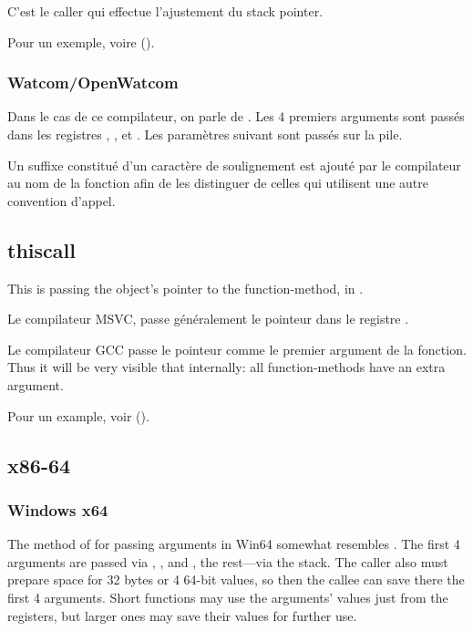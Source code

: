 C'est le \gls{caller} qui effectue l'ajustement du \gls{stack pointer}.

Pour un exemple, voire ().

\subsubsection{Watcom/OpenWatcom}

Dans le cas de ce compilateur, on parle de .
Les 4 premiers arguments sont passés dans les registres \EAX, \EDX, \EBX et \ECX.
Les paramètres suivant sont passés sur la pile.

Un suffixe constitué d'un caractère de soulignement est ajouté par le compilateur au nom de la
fonction afin de les distinguer de celles qui utilisent une autre convention d'appel.

\subsection{thiscall}

This is passing the object's \ITthis pointer to the function-method, in \Cpp.

Le compilateur MSVC, passe généralement le pointeur \ITthis dans le registre \ECX.

Le compilateur GCC passe le pointeur \ITthis comme le premier argument de la fonction.
Thus it will be very visible that internally: all function-methods have an extra argument.

Pour un example, voir ().

\subsection{x86-64}

\subsubsection{Windows x64}
\label{sec:callingconventions_win64}

The method of for passing arguments in Win64 somewhat resembles .
The first 4 arguments are passed via \RCX, \RDX,  and , the rest---via the stack.
The \gls{caller} also must prepare space for 32 bytes or 4 64-bit values,
so then the \gls{callee} can save there the first 4 arguments.
Short functions may use the arguments' values just from the registers,
but larger ones may save their values for further use.


